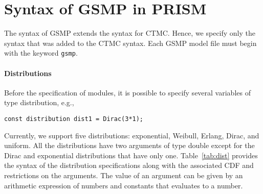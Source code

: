 \documentclass{article}
\renewcommand{\_}{\underline{~}}
\newcommand{\code}[1]{\texttt{#1}}
\begin{document}
\section*{Syntax of GSMP in PRISM}
The syntax of GSMP extends the syntax for CTMC.
Hence, we specify only the syntax that was added to the CTMC syntax. 
Each GSMP model file must begin with the keyword \code{gsmp}. 

\paragraph{Distributions}
Before the specification of modules, it is possible to specify several variables of type distribution, e.g., 
\begin{center}
	\code{const distribution dist1 = Dirac(3*1);}
\end{center}
Currently, we support five distributions: exponential, Weibull, Erlang, Dirac, and uniform.
All the distributions have two arguments of type double except for the Dirac and exponential distributions that have only one.
Table~\ref{tab:dist} provides the syntax of the distribution specifications along with the associated CDF and restrictions on the arguments. 
The value of an argument can be given by an arithmetic expression of numbers and constants that evaluates to a number.
\end{document}
